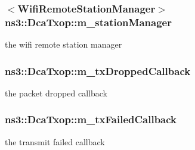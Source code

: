 \subsubsection[{\texorpdfstring{m\+\_\+station\+Manager}{m_stationManager}}]{$<${\bf Wifi\+Remote\+Station\+Manager}$>$ ns3\+::\+Dca\+Txop\+::m\+\_\+station\+Manager\hspace{0.3cm}{\ttfamily [protected]}}\hypertarget{classns3_1_1DcaTxop_af78d36622900e857d31315038946d8f6}{}\label{classns3_1_1DcaTxop_af78d36622900e857d31315038946d8f6}


the wifi remote station manager 

\subsubsection[{\texorpdfstring{m\+\_\+tx\+Dropped\+Callback}{m_txDroppedCallback}}]{ ns3\+::\+Dca\+Txop\+::m\+\_\+tx\+Dropped\+Callback\hspace{0.3cm}{\ttfamily [protected]}}\hypertarget{classns3_1_1DcaTxop_afcbfde214243789777b66de41ccf0088}{}\label{classns3_1_1DcaTxop_afcbfde214243789777b66de41ccf0088}


the packet dropped callback 

\subsubsection[{\texorpdfstring{m\+\_\+tx\+Failed\+Callback}{m_txFailedCallback}}]{ ns3\+::\+Dca\+Txop\+::m\+\_\+tx\+Failed\+Callback\hspace{0.3cm}{\ttfamily [protected]}}\hypertarget{classns3_1_1DcaTxop_a3d58ad498059e9751312a7ee5b364678}{}\label{classns3_1_1DcaTxop_a3d58ad498059e9751312a7ee5b364678}


the transmit failed callback 

